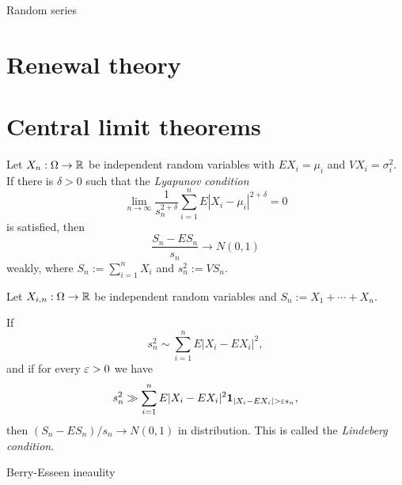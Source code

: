\documentclass{../note}
\begin{document}
Random series

\section{Renewal theory}





\section{Central limit theorems}


\begin{prb}
Let $X_n:\Omega\to\mathbb{R}$ be independent random variables with $EX_i=\mu_i$ and $VX_i=\sigma_i^2$.
If there is $\delta>0$ such that the \emph{Lyapunov condition}
\[\lim_{n\to\infty}\frac1{s_n^{2+\delta}}\sum_{i=1}^nE|X_i-\mu_i|^{2+\delta}=0\]
is satisfied, then
\[\frac{S_n-ES_n}{s_n}\to N(0,1)\]
weakly, where $S_n:=\sum_{i=1}^nX_i$ and $s_n^2:=VS_n$.
\end{prb}

\begin{prb}
Let $X_{i,n}:\Omega\to\mathbb{R}$ be independent random variables and $S_n:=X_1+\cdots+X_n$.
\begin{parts}
\item
If
\[s_n^2\sim\sum_{i=1}^nE|X_i-EX_i|^2,\]
and if for every $\varepsilon>0$ we have
\[s_n^2\gg\sum_{i=1}^nE|X_i-EX_i|^2\1_{|X_i-EX_i|>\e s_n},\]
then $(S_n-ES_n)/s_n\to N(0,1)$ in distribution.
This is called the \emph{Lindeberg condition}.
\item

\end{parts}
\end{prb}


Berry-Esseen ineaulity
\end{document}
